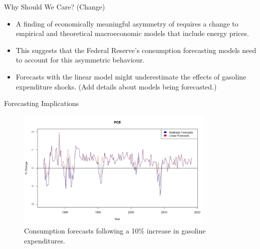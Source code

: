 \documentclass[
  10pt,
  ignorenonframetext,
]{beamer}
\begin{document}
\begin{frame}{Why Should We Care? (Change)}
\protect\hypertarget{why-should-we-care-change}{}

\begin{itemize}
\item
  A finding of economically meaningful asymmetry of requires a change to
  empirical and theoretical macroeconomic models that include energy
  prices.
\item
  This suggests that the Federal Reserve's consumption forecasting
  models need to account for this asymmetric behaviour.
\item
  Forecasts with the linear model might underestimate the effects of
  gasoline expenditure shocks. (Add details about models being
  forecasted.)
\end{itemize}

\end{frame}

\begin{frame}{Forecasting Implications}
\protect\hypertarget{forecasting-implications}{}

\begin{figure}
\centering
\includegraphics[width=0.85\textwidth,height=\textheight]{Forecasts - PCE.jpeg}
\caption{Consumption forecasts following a 10\% increase in gasoline
expenditures.}
\end{figure}

\end{frame}
\end{document}
